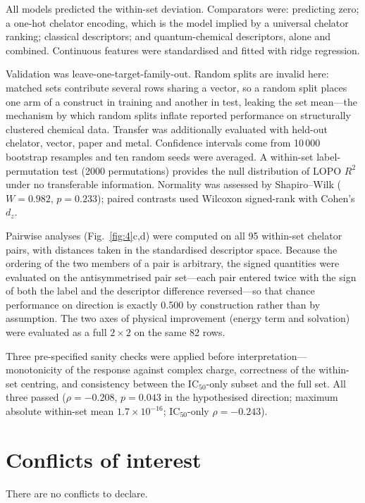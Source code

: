 \documentclass[twoside,twocolumn,9pt]{article}
\begin{document}
All models predicted the within-set deviation. Comparators were: predicting zero; a one-hot chelator encoding, which is the model implied by a universal chelator ranking; classical descriptors; and quantum-chemical descriptors, alone and combined. Continuous features were standardised and fitted with ridge regression.

Validation was leave-one-target-family-out. Random splits are invalid here: matched sets contribute several rows sharing a vector, so a random split places one arm of a construct in training and another in test, leaking the set mean---the mechanism by which random splits inflate reported performance on structurally clustered chemical data.\cite{Kim2026TAS2R,Boldini2025UMAP,Tropsha2025Eval} Transfer was additionally evaluated with held-out chelator, vector, paper and metal. Confidence intervals come from 10\,000 bootstrap resamples and ten random seeds were averaged. A within-set label-permutation test (2000 permutations) provides the null distribution of LOPO $R^2$ under no transferable information. Normality was assessed by Shapiro--Wilk ($W = 0.982$, $p = 0.233$); paired contrasts used Wilcoxon signed-rank with Cohen's $d_z$.

Pairwise analyses (Fig.~\ref{fig:4}c,d) were computed on all 95 within-set chelator pairs, with distances taken in the standardised descriptor space. Because the ordering of the two members of a pair is arbitrary, the signed quantities were evaluated on the antisymmetrised pair set---each pair entered twice with the sign of both the label and the descriptor difference reversed---so that chance performance on direction is exactly 0.500 by construction rather than by assumption. The two axes of physical improvement (energy term and solvation) were evaluated as a full $2 \times 2$ on the same 82 rows.

Three pre-specified sanity checks were applied before interpretation---monotonicity of the response against complex charge, correctness of the within-set centring, and consistency between the IC$_{50}$-only subset and the full set. All three passed ($\rho = -0.208$, $p = 0.043$ in the hypothesised direction; maximum absolute within-set mean $1.7\times10^{-16}$; IC$_{50}$-only $\rho = -0.243$).

\section*{Conflicts of interest}
There are no conflicts to declare.
\end{document}

